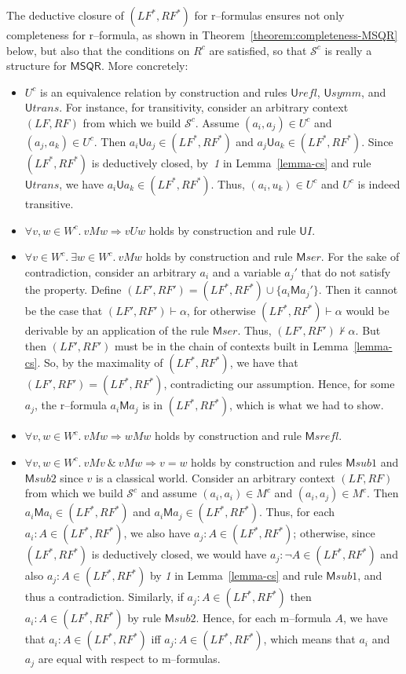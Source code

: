 \documentclass[times, 10pt]{article}
\newcommand{\MSQR}{\textsf{MSQR}}
\newcommand{\Un}{\textsf{U}}
\newcommand{\Me}{\textsf{M}}
\newcommand{\Unr}{\Un \mathit{refl}}
\newcommand{\Uns}{\Un \mathit{symm}}
\newcommand{\Unt}{\Un \mathit{trans}}
\renewcommand{\Un}{\mathsf{U}}
\renewcommand{\Me}{\mathsf{M}}
\newcommand{\Meser}{\Me\mathit{ser}}
\newcommand{\Mesrefl}{\Me\mathit{srefl}}
\newcommand{\Mesubone}{\Me\mathit{sub1}}
\newcommand{\Mesubtwo}{\Me\mathit{sub2}}
\newcommand{\LF}{\mathit{LF}}
\newcommand{\RF}{\mathit{RF}}
\begin{document}
The deductive closure of $(\LF^*,\RF^*)$ for r--formulas ensures not only completeness for
r--formula, as shown in Theorem~\ref{theorem:completeness-MSQR} below, but also that
the conditions on $R^c$ are satisfied, so that $\mathscr{S}^c$ is really a structure
for $\MSQR$. More concretely:
\begin{itemize}
\item $U^c$ is an equivalence relation by construction and rules $\Unr$, $\Uns$, and $\Unt$. 
For instance, for transitivity, consider an arbitrary context $(\LF,\RF)$ from which we build 
$\mathscr{S}^c$. Assume $(a_i,a_j) \in U^c$ and $(a_j,a_k) \in U^c$.  Then 
$a_i \Un a_j \in (\LF^*,\RF^*)$ and $a_j \Un a_k \in (\LF^*,\RF^*)$. Since $(\LF^*,\RF^*)$ is
deductively closed, by~\emph{1} in Lemma~\ref{lemma-cs} and rule $\Unt$, we have 
$a_i \Un a_k \in (\LF^*,\RF^*)$. Thus, $(a_i,u_k) \in U^c$ and $U^c$ is indeed transitive.

\item $\forall v, w \in W^c.\ v M w \Longrightarrow v U w$ holds by construction and rule $\Un I$.

\item $\forall v \in W^c.\ \exists w \in W^c.\ v M w$ holds by construction and rule $\Meser$.
For the sake of contradiction, consider an arbitrary $a_i$ and a variable $a_j'$ 
that do not satisfy the property. Define $(\LF',\RF') = (\LF^*,\RF^*) \cup \{a_i \Me a_j'\}$. 
Then it cannot be the case that $(\LF',\RF') \vdash \alpha$, for otherwise $(\LF^*,
\RF^*) \vdash \alpha$ would be derivable by an application of the rule $\Meser$. Thus, 
$(\LF',\RF') \nvdash \alpha$. But then $(\LF',\RF')$ must be in the chain of contexts built in 
Lemma~\ref{lemma-cs}. So, by the maximality of $(\LF^*,\RF^*)$, we have that 
$(\LF',\RF') = (\LF^*,\RF^*)$, contradicting our assumption. Hence, for some $a_j$, the r--formula 
$a_i \Me a_j$ is in $(\LF^*,\RF^*)$, which is what we had to show.

\item $\forall v, w \in W^c.\ v M w \Longrightarrow w M w$ holds by construction and rule $\Mesrefl$.

\item $\forall v, w \in W^c.\ v M v \ \& \ v M w \Longrightarrow v=w$  holds by construction and
rules $\Mesubone$ and $\Mesubtwo$ since $v$ is a classical world.
Consider an arbitrary context $(\LF,\RF)$ from which we build $\mathscr{S}^c$ and assume
$(a_i,a_i) \in M^c$ and $(a_i,a_j) \in M^c$. Then $a_i \Me a_i \in (\LF^*,\RF^*)$ and 
$a_i \Me a_j \in (\LF^*,\RF^*)$. Thus, for each $a_i:A \in (\LF^*,\RF^*)$, we also have 
$a_j:A \in (\LF^*,\RF^*)$; otherwise, since $(\LF^*,\RF^*)$ is deductively closed, we would have 
$a_j: \neg A \in (\LF^*,\RF^*)$ and also $a_j: A \in (\LF^*,\RF^*)$ by \emph{1} in 
Lemma~\ref{lemma-cs} and rule $\Mesubone$, and thus a contradiction. Similarly, if 
$a_j:A \in (\LF^*,\RF^*)$ then $a_i:A \in (\LF^*,\RF^*)$ by rule $\Mesubtwo$. Hence, for each 
m--formula $A$, we have that $a_i:A \in (\LF^*,\RF^*)$ iff $a_j:A \in (\LF^*,\RF^*)$, which
means that $a_i$ and $a_j$ are equal with respect to m--formulas. 


\end{itemize}
\end{document}
